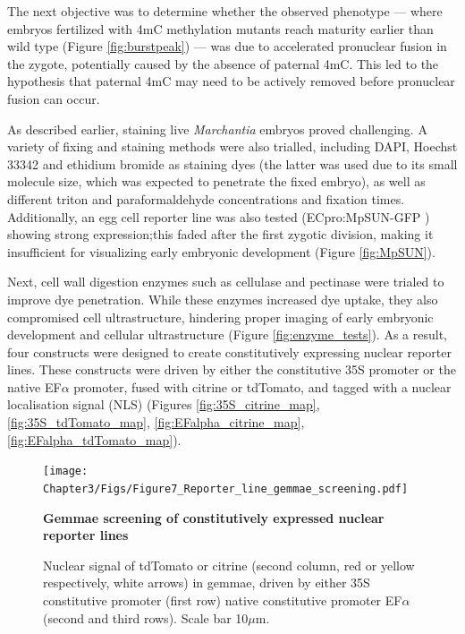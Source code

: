 The next objective was to determine whether the observed phenotype — where embryos fertilized with 4mC methylation mutants reach maturity earlier than wild type (Figure \ref{fig:burstpeak}) — was due to accelerated pronuclear fusion in the zygote, potentially caused by the absence of paternal 4mC. This led to the hypothesis that paternal 4mC may need to be actively removed before pronuclear fusion can occur.

As described earlier, staining live \textit{Marchantia} embryos proved challenging. A variety of fixing and staining methods were also trialled, including DAPI, Hoechst 33342 and ethidium bromide as staining dyes (the latter was used due to its small molecule size, which was expected to penetrate the fixed embryo), as well as different triton and paraformaldehyde concentrations and fixation times. Additionally, an egg cell reporter line was also tested (ECpro:MpSUN-GFP \citep{RN139}) showing strong expression;this faded after the first zygotic division, making it insufficient for visualizing early embryonic development (Figure \ref{fig:MpSUN}). 

Next, cell wall digestion enzymes such as cellulase and pectinase were trialed to improve dye penetration. While these enzymes increased dye uptake, they also compromised cell ultrastructure, hindering proper imaging of early embryonic development and cellular ultrastructure (Figure \ref{fig:enzyme_tests}). As a result, four constructs were designed to create constitutively expressing nuclear reporter lines. These constructs were driven by either the constitutive 35S promoter or the native EF$\alpha$ promoter, fused with citrine or tdTomato, and tagged with a nuclear localisation signal (NLS) (Figures \ref{fig:35S_citrine_map}, \ref{fig:35S_tdTomato_map}, \ref{fig:EFalpha_citrine_map}, \ref{fig:EFalpha_tdTomato_map}). 

\begin{figure}[htbp!] 
\centering    
    \texttt{[image: Chapter3/Figs/Figure7\_Reporter\_line\_gemmae\_screening.pdf]}
\caption{\textbf{Gemmae screening of constitutively expressed nuclear reporter lines}}
\label{fig:gemma:screen}
\captionsetup{font=small}
    \caption*{Nuclear signal of tdTomato or citrine (second column, red or yellow respectively, white arrows) in gemmae, driven by either 35S constitutive promoter (first row) native constitutive promoter EF$\alpha$ (second and third rows). Scale bar 10$\mu$m.}
\end{figure}

